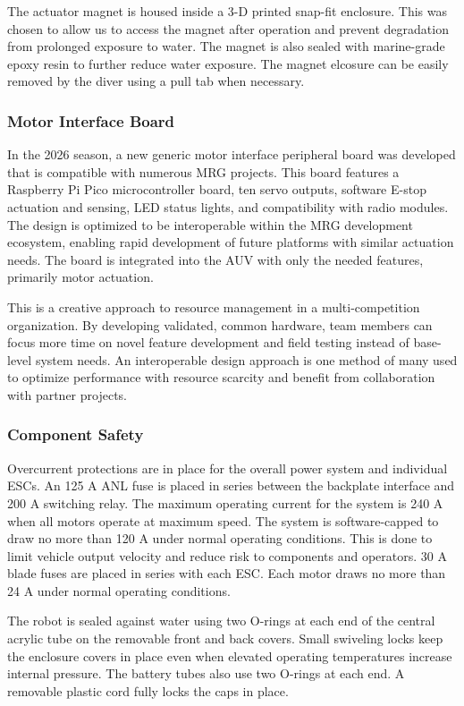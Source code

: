 \documentclass[conference]{IEEEtran}
\begin{document}
The actuator magnet is housed inside a 3-D printed snap-fit enclosure. This was chosen to allow us to access the magnet after operation and prevent degradation from prolonged exposure to water. The magnet is also sealed with marine-grade epoxy resin to further reduce water exposure. The magnet elcosure can be easily removed by the diver using a pull tab when necessary. 

\subsubsection{Motor Interface Board}
In the 2026 season, a new generic motor interface peripheral board was developed that is compatible with numerous MRG projects. This board features a Raspberry Pi Pico microcontroller board, ten servo outputs, software E-stop actuation and sensing, LED status lights, and compatibility with radio modules. The design is optimized to be interoperable within the MRG development ecosystem, enabling rapid development of future platforms with similar actuation needs. The board is integrated into the AUV with only the needed features, primarily motor actuation.

This is a creative approach to resource management in a multi-competition organization. By developing validated, common hardware, team members can focus more time on novel feature development and field testing instead of base-level system needs. An interoperable design approach is one method of many used to optimize performance with resource scarcity and benefit from collaboration with partner projects.

\subsubsection{Component Safety}
Overcurrent protections are in place for the overall power system and individual ESCs. An 125 A ANL fuse is placed in series between the backplate interface and 200 A switching relay. The maximum operating current for the system is 240 A when all motors operate at maximum speed. The system is software-capped to draw no more than 120 A under normal operating conditions. This is done to limit vehicle output velocity and reduce risk to components and operators. 30 A blade fuses are placed in series with each ESC. Each motor draws no more than 24 A under normal operating conditions. 

The robot is sealed against water using two O-rings at each end of the central acrylic tube on the removable front and back covers. Small swiveling locks keep the enclosure covers in place even when elevated operating temperatures increase internal pressure. The battery tubes also use two O-rings at each end. A removable plastic cord fully locks the caps in place. 
\end{document}
